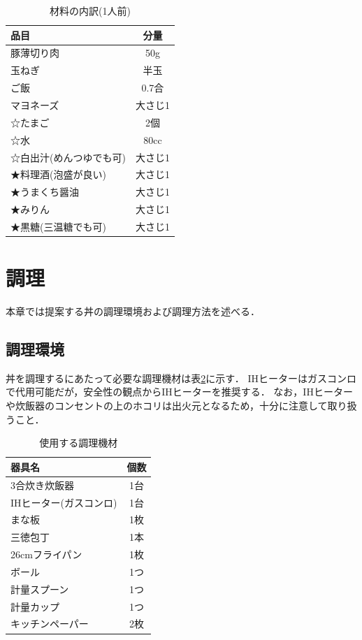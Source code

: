 \begin{table}[ht]
\caption{材料の内訳(1人前)\label{ta:components}}
\centering
\begin{tabular}[]{@{}lc@{}}





\toprule
品目 & 分量\\
\midrule

豚薄切り肉 & 50g\\
玉ねぎ & 半玉\\
ご飯 & 0.7合\\
マヨネーズ & 大さじ1\\
☆たまご & 2個\\
☆水 & 80cc\\
☆白出汁(めんつゆでも可) & 大さじ1\\
★料理酒(泡盛が良い) & 大さじ1\\
★うまくち醤油 & 大さじ1\\
★みりん & 大さじ1\\
★黒糖(三温糖でも可) & 大さじ1\\
\bottomrule
\end{tabular}

\end{table}

\section{調理}\label{ux8abfux7406}

本章では提案する丼の調理環境および調理方法を述べる．

\subsection{調理環境}\label{ux8abfux7406ux74b0ux5883}

丼を調理するにあたって必要な調理機材は表\ref{ta:maker}に示す．
IHヒーターはガスコンロで代用可能だが，安全性の観点からIHヒーターを推奨する．
なお，IHヒーターや炊飯器のコンセントの上のホコリは出火元となるため，十分に注意して取り扱うこと．

\begin{table}[ht]
\caption{使用する調理機材\label{ta:maker}}
\centering
\begin{tabular}[]{@{}lc@{}}





\toprule
器具名 & 個数\\
\midrule

3合炊き炊飯器 & 1台\\
IHヒーター(ガスコンロ) & 1台\\
まな板 & 1枚\\
三徳包丁 & 1本\\
26cmフライパン & 1枚\\
ボール & 1つ\\
計量スプーン & 1つ\\
計量カップ & 1つ\\
キッチンペーパー & 2枚\\
\bottomrule
\end{tabular}

\end{table}

